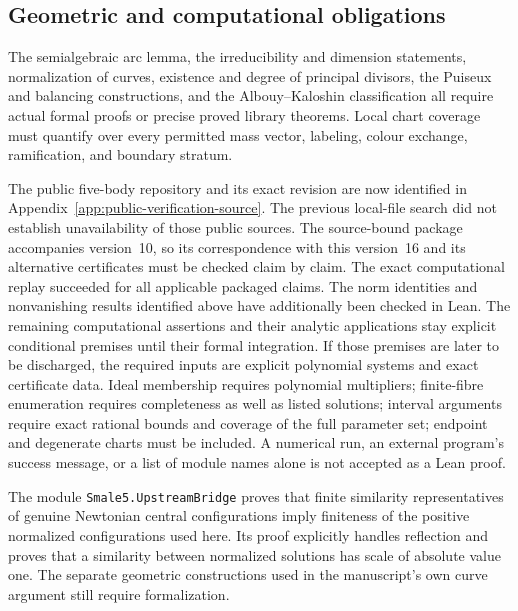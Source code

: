 \documentclass[Threeside,11pt]{article}
\theoremstyle{definition}
\theoremstyle{remark}
\numberwithin{equation}{section}
\theoremstyle{remark}
\newcommand{\code}[1]{\begingroup\def\_{\textunderscore\allowbreak}\texttt{#1}\endgroup}
\begin{document}
\subsection{Geometric and computational obligations}
The semialgebraic arc lemma, the irreducibility and dimension statements,
normalization of curves, existence and degree of principal divisors, the
Puiseux and balancing constructions, and the Albouy--Kaloshin classification
all require actual formal proofs or precise proved library theorems.
Local chart coverage must quantify over every permitted mass vector, labeling,
colour exchange, ramification, and boundary stratum.

The public five-body repository and its exact revision are now identified in
Appendix~\ref{app:public-verification-source}. The previous local-file search
did not establish unavailability of those public sources. The source-bound
package accompanies version~10, so its correspondence with this version~16
and its alternative certificates must be checked claim by claim. The exact computational replay succeeded for all applicable packaged claims.
The norm identities and nonvanishing results identified above have additionally
been checked in Lean. The remaining computational assertions and their analytic
applications stay explicit conditional premises until their formal integration.
If those premises are later to be discharged, the required inputs are explicit polynomial
systems and exact certificate data. Ideal membership requires polynomial
multipliers; finite-fibre enumeration requires completeness as well as listed
solutions; interval arguments require exact rational bounds and coverage of
the full parameter set; endpoint and degenerate charts must be included.
A numerical run, an external program's success message, or a list of module
names alone is not accepted as a Lean proof.

The module \code{Smale5.UpstreamBridge} proves that finite similarity
representatives of genuine Newtonian central configurations imply finiteness
of the positive normalized configurations used here. Its proof explicitly
handles reflection and proves that a similarity between normalized solutions
has scale of absolute value one. The separate geometric constructions used
in the manuscript's own curve argument still require formalization.
\end{document}

